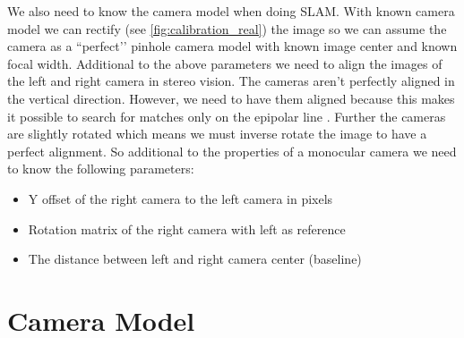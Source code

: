\documentclass[11pt,a4paper,titlepage,oneside]{report}
\begin{document}
We also need to know the camera model when doing SLAM. With known camera model we can rectify (see \ref{fig:calibration_real}) the image so we can assume the camera as a ``perfect’’ pinhole camera model with known image center and known focal width. Additional to the above parameters we need to align the images of the left and right camera in stereo vision. The cameras aren’t perfectly aligned in the vertical direction. However, we need to have them aligned because this makes it possible to search for matches only on the epipolar line \cite{mvg}. Further the cameras are slightly rotated which means we must inverse rotate the image to have a perfect alignment. So additional to the properties of a monocular camera we need to know the following parameters:
\begin{itemize}
	\item Y offset of the right camera to the left camera in pixels
	\item Rotation matrix of the right camera with left as reference
	\item The distance between left and right camera center (baseline)
\end{itemize}

\section{Camera Model}
\end{document}
